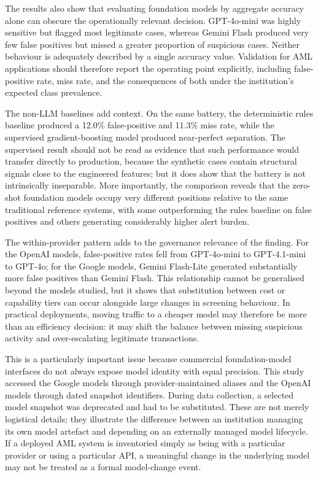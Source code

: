 \documentclass[pdflatex,sn-basic,Numbered]{sn-jnl}
\begin{document}
The results also show that evaluating foundation models by aggregate accuracy alone can obscure the operationally relevant decision. GPT-4o-mini was highly sensitive but flagged most legitimate cases, whereas Gemini Flash produced very few false positives but missed a greater proportion of suspicious cases. Neither behaviour is adequately described by a single accuracy value. Validation for AML applications should therefore report the operating point explicitly, including false-positive rate, miss rate, and the consequences of both under the institution's expected class prevalence.

The non-LLM baselines add context. On the same battery, the deterministic rules baseline produced a 12.0\% false-positive and 11.3\% miss rate, while the supervised gradient-boosting model produced near-perfect separation. The supervised result should not be read as evidence that such performance would transfer directly to production, because the synthetic cases contain structural signals close to the engineered features; but it does show that the battery is not intrinsically inseparable. More importantly, the comparison reveals that the zero-shot foundation models occupy very different positions relative to the same traditional reference systems, with some outperforming the rules baseline on false positives and others generating considerably higher alert burden.

The within-provider pattern adds to the governance relevance of the finding. For the OpenAI models, false-positive rates fell from GPT-4o-mini to GPT-4.1-mini to GPT-4o; for the Google models, Gemini Flash-Lite generated substantially more false positives than Gemini Flash. This relationship cannot be generalised beyond the models studied, but it shows that substitution between cost or capability tiers can occur alongside large changes in screening behaviour. In practical deployments, moving traffic to a cheaper model may therefore be more than an efficiency decision: it may shift the balance between missing suspicious activity and over-escalating legitimate transactions.

This is a particularly important issue because commercial foundation-model interfaces do not always expose model identity with equal precision. This study accessed the Google models through provider-maintained aliases and the OpenAI models through dated snapshot identifiers. During data collection, a selected model snapshot was deprecated and had to be substituted. These are not merely logistical details; they illustrate the difference between an institution managing its own model artefact and depending on an externally managed model lifecycle. If a deployed AML system is inventoried simply as being with a particular provider or using a particular API, a meaningful change in the underlying model may not be treated as a formal model-change event.
\end{document}
